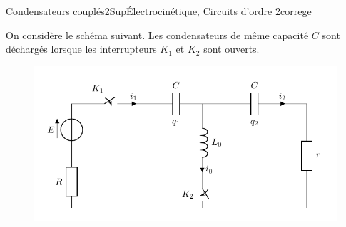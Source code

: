 
\begin{exercise}{Condensateurs couplés}{2}{Sup}{\'Electrocinétique, Circuits d'ordre 2}{correge}

On considère le schéma suivant. Les condensateurs de même capacité $C$ sont déchargés lorsque les interrupteurs $K_1$ et $K_2$ sont ouverts.

\begin{figure}[H]
\centering
\includegraphics[scale=0.9]{elec/CondCouples.pdf}
\end{figure}

\begin{questions}


\end{questions}
\end{exercise}
